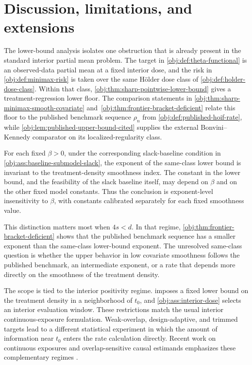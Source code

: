 \section{Discussion, limitations, and extensions}

The lower-bound analysis isolates one obstruction that is already present in the standard interior partial mean problem. The target in \cref{obj:def:theta-functional} is an observed-data partial mean at a fixed interior dose, and the risk in \cref{obj:def:minimax-risk} is taken over the same Hölder dose class of \cref{obj:def:holder-dose-class}. Within that class, \cref{obj:thm:sharp-pointwise-lower-bound} gives a treatment-regression lower floor. The comparison statements in \cref{obj:thm:sharp-minimax-smooth-covariate} and~\cref{obj:thm:frontier-bracket-deficient} relate this floor to the published benchmark sequence \(\rho_n\) from \cref{obj:def:published-hoif-rate}, while \cref{obj:lem:published-upper-bound-cited} supplies the external Bonvini--Kennedy comparator on its localized-regularity class.

For each fixed \(\beta>0\), under the corresponding slack-baseline condition in \cref{obj:ass:baseline-submodel-slack}, the exponent of the same-class lower bound is invariant to the treatment-density smoothness index. The constant in the lower bound, and the feasibility of the slack baseline itself, may depend on \(\beta\) and on the other fixed model constants. Thus the conclusion is exponent-level insensitivity to \(\beta\), with constants calibrated separately for each fixed smoothness value.

This distinction matters most when \(4s<d\). In that regime, \cref{obj:thm:frontier-bracket-deficient} shows that the published benchmark sequence has a smaller exponent than the same-class lower-bound exponent. The unresolved same-class question is whether the upper behavior in low covariate smoothness follows the published benchmark, an intermediate exponent, or a rate that depends more directly on the smoothness of the treatment density.

The scope is tied to the interior positivity regime.  imposes a fixed lower bound on the treatment density in a neighborhood of \(t_0\), and \cref{obj:ass:interior-dose} selects an interior evaluation window. These restrictions match the usual interior continuous-exposure formulation. Weak-overlap, design-adaptive, and trimmed targets lead to a different statistical experiment in which the amount of information near \(t_0\) enters the rate calculation directly. Recent work on continuous exposures and overlap-sensitive causal estimands emphasizes these complementary regimes \citep{hejazi2022,doss2022,hudson2023,shi2024,zhang2024,schindl2024,bonvini2024}.

